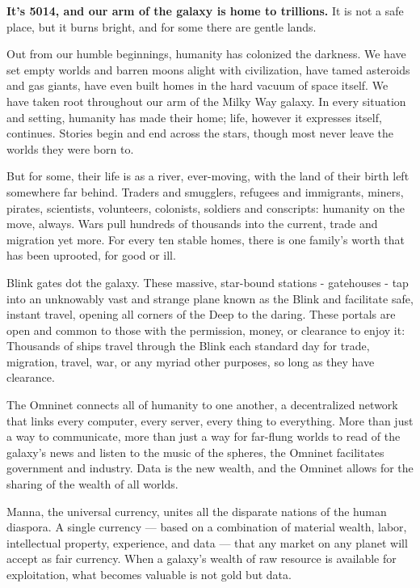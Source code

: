 \textbf{\Large It’s 5014, and our arm of the galaxy is home to trillions.} It is not a safe place,
but it burns bright, and for some there are gentle lands.

Out from our humble beginnings, humanity has colonized the darkness. We have set empty
worlds and barren moons alight with civilization, have tamed asteroids and gas giants, have even
built homes in the hard vacuum of space itself. We have taken root throughout our arm of the
Milky Way galaxy. In every situation and setting, humanity has made their home; life, however it
expresses itself, continues. Stories begin and end across the stars, though most never leave the
worlds they were born to.

But for some, their life is as a river, ever-moving, with the land of their birth left somewhere far
behind. Traders and smugglers, refugees and immigrants, miners, pirates, scientists, volunteers,
colonists, soldiers and conscripts: humanity on the move, always. Wars pull hundreds of
thousands into the current, trade and migration yet more. For every ten stable homes, there is
one family’s worth that has been uprooted, for good or ill.

Blink gates dot the galaxy. These massive, star-bound stations - gatehouses - tap into an
unknowably vast and strange plane known as the Blink and facilitate safe, instant travel, opening
all corners of the Deep to the daring. These portals are open and common to those with the
permission, money, or clearance to enjoy it: Thousands of ships travel through the Blink each
standard day for trade, migration, travel, war, or any myriad other purposes, so long as they have
clearance.

The Omninet connects all of humanity to one another, a decentralized network that links every
computer, every server, every thing to everything. More than just a way to communicate, more
than just a way for far-flung worlds to read of the galaxy’s news and listen to the music of the
spheres, the Omninet facilitates government and industry. Data is the new wealth, and the
Omninet allows for the sharing of the wealth of all worlds.

Manna, the universal currency, unites all the disparate nations of the human diaspora. A single
currency — based on a combination of material wealth, labor, intellectual property, experience,
and data — that any market on any planet will accept as fair currency. When a galaxy’s wealth of
raw resource is available for exploitation, what becomes valuable is not gold but data.


